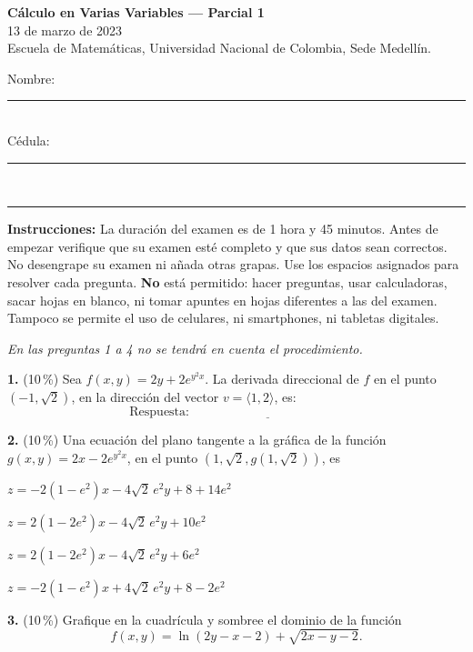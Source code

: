 \documentclass[11pt]{article}
\newcommand{\examheader}{%
  \noindent
  \begin{minipage}[t]{0.62\linewidth}
    {\bfseries\large C\'alculo en Varias Variables --- Parcial 1}\\
    {\small 13 de marzo de 2023}\\
    {\small Escuela de Matem\'aticas, Universidad Nacional de Colombia, Sede Medell\'in.}
  \end{minipage}%
  \hfill
  \begin{minipage}[t]{0.33\linewidth}
    \raggedleft\small
    Nombre: \rule{2.8cm}{0.4pt}\\[4pt]
    C\'edula: \rule{2.8cm}{0.4pt}
  \end{minipage}\\[4pt]
  \rule{\linewidth}{0.6pt}
}
\begin{document}
\examheader

\textbf{Instrucciones:} La duraci\'on del examen es de 1 hora y 45 minutos. Antes de empezar verifique que su examen est\'e completo y que sus datos sean correctos. No desengrape su examen ni a\~nada otras grapas. Use los espacios asignados para resolver cada pregunta. \textbf{No} est\'a permitido: hacer preguntas, usar calculadoras, sacar hojas en blanco, ni tomar apuntes en hojas diferentes a las del examen. Tampoco se permite el uso de celulares, ni smartphones, ni tabletas digitales.

\bigskip

\textit{En las preguntas 1 a 4 no se tendr\'a en cuenta el procedimiento.}

\bigskip
\noindent\textbf{1.} (10\,\%) Sea $f(x,y)=2y+2e^{y^2x}$. La derivada direccional de $f$ en el punto $(-1,\sqrt2)$, en la direcci\'on del vector $v=\langle 1,2\rangle$, es:
$$\text{Respuesta:}\ \underline{\hspace{5cm}}$$

\bigskip
\noindent\textbf{2.} (10\,\%) Una ecuaci\'on del plano tangente a la gr\'afica de la funci\'on $g(x,y)=2x-2e^{y^2x}$, en el punto $(1,\sqrt2,g(1,\sqrt2))$, es

\begin{opciones}
  \item $z = -2(1-e^2)x - 4\sqrt2\,e^2y + 8+14e^2$
  \item $z = 2(1-2e^2)x - 4\sqrt2\,e^2y + 10e^2$
  \item $z = 2(1-2e^2)x - 4\sqrt2\,e^2y + 6e^2$
  \item $z = -2(1-e^2)x + 4\sqrt2\,e^2y + 8-2e^2$
\end{opciones}

\bigskip
\noindent\textbf{3.} (10\,\%) Grafique en la cuadr\'icula y sombree el dominio de la funci\'on
$$f(x,y) = \ln(2y-x-2) + \sqrt{2x-y-2}.$$

\begin{center}
\end{center}
\end{document}
